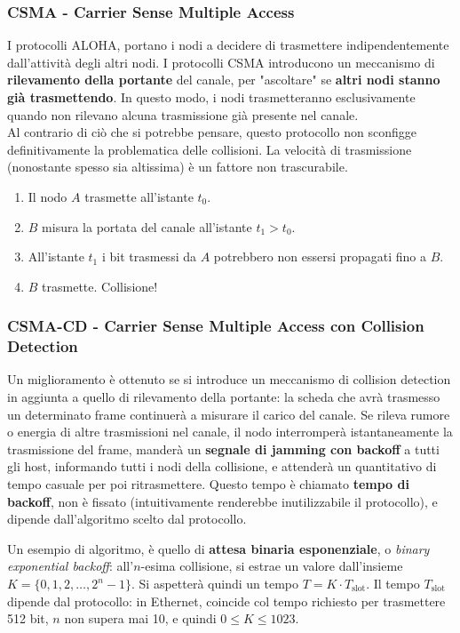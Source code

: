 \subsubsection{CSMA - Carrier Sense Multiple Access}
I protocolli ALOHA, portano i nodi a decidere di trasmettere indipendentemente dall'attività degli altri nodi. I protocolli CSMA introducono un meccanismo di \textbf{rilevamento della portante} del canale, per "ascoltare" se \textbf{altri nodi stanno già trasmettendo}.
In questo modo, i nodi trasmetteranno esclusivamente quando non rilevano alcuna trasmissione già presente nel canale.\\
Al contrario di ciò che si potrebbe pensare, questo protocollo non sconfigge definitivamente la problematica delle collisioni.
La velocità di trasmissione (nonostante spesso sia altissima) è un fattore non trascurabile.
\begin{enumerate}
	\item Il nodo $A$ trasmette all'istante $t_0$.
	\item $B$ misura la portata del canale all'istante $t_1>t_0$. 
	\item All'istante $t_1$ i bit trasmessi da $A$ potrebbero non essersi propagati fino a $B$.
	\item $B$ trasmette. Collisione!
\end{enumerate}


\subsubsection{CSMA-CD - Carrier Sense Multiple Access con Collision Detection}
Un miglioramento è ottenuto se si introduce un meccanismo di collision detection in aggiunta a quello di rilevamento della portante: la scheda che avrà trasmesso un determinato frame continuerà a misurare il carico del canale. Se rileva rumore o energia di altre trasmissioni nel canale, il nodo interromperà istantaneamente la trasmissione del frame, manderà un \textbf{segnale di jamming con backoff} a tutti gli host, informando tutti i nodi della collisione, e attenderà un quantitativo di tempo casuale per poi ritrasmettere. Questo tempo è chiamato \textbf{tempo di backoff}, non è fissato (intuitivamente renderebbe inutilizzabile il protocollo), e dipende dall'algoritmo scelto dal protocollo.

Un esempio di algoritmo, è quello di \textbf{attesa binaria esponenziale}, o \textit{binary exponential backoff}:
all'$n$-esima collisione, si estrae un valore dall'insieme $K=\{0,1,2,\dots,2^n-1\}$.
Si aspetterà quindi un tempo $T = K \cdot T_\text{slot}$. Il tempo $T_\text{slot}$ dipende dal protocollo: in Ethernet, coincide col tempo richiesto per trasmettere 512 bit, $n$ non supera mai 10, e quindi $0\leq K \leq1023$.

